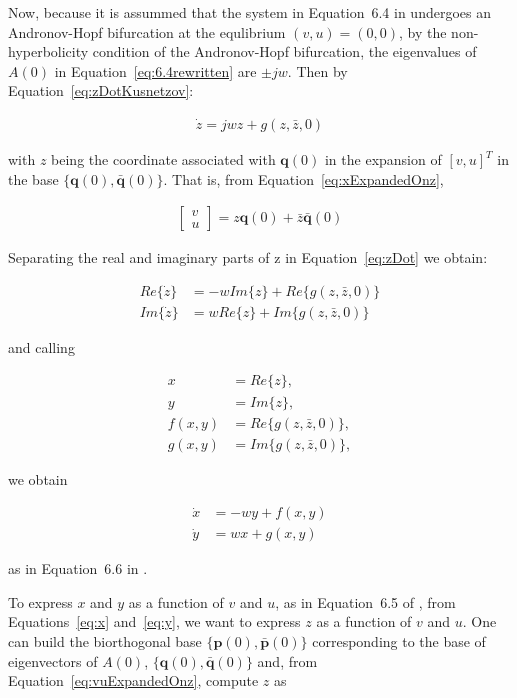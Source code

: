 \documentclass{article}
\theoremstyle{lemma}
\begin{document}
Now, because it is assummed that the system in Equation~6.4 in
\citet{izhikevich07} undergoes an Andronov-Hopf bifurcation at the equlibrium
$(v,u)=(0,0)$, by the non-hyperbolicity condition of the Andronov-Hopf
bifurcation, the eigenvalues of $A(0)$
in Equation~\ref{eq:6.4rewritten} are $\pm jw$. Then by
Equation~\ref{eq:zDotKusnetzov}:

\begin{align}
    \dot{z}=jwz+g(z,\bar{z},0)
    \label{eq:zDot}
\end{align}

\noindent with 
$z$ being
the coordinate associated with $\mathbf{q}(0)$ in the expansion of
$[v,u]^T$ in the base $\{\mathbf{q}(0),\mathbf{\bar{q}}(0)\}$.
That is, from Equation~\ref{eq:xExpandedOnz},

\begin{align}
\left[\begin{array}{c}
        v\\
        u
       \end{array}\right]=z\mathbf{q}(0)+\bar{z}\mathbf{\bar{q}}(0)
\label{eq:vuExpandedOnz}
\end{align}

Separating the real and imaginary parts of z in Equation~\ref{eq:zDot} we
obtain:

\begin{align}
    Re\{\dot{z}\}&=-wIm\{z\}+Re\{g(z,\bar{z},0)\}\nonumber\\
    Im\{\dot{z}\}&=wRe\{z\}+Im\{g(z,\bar{z},0)\}\nonumber
\end{align}

\noindent and calling 

\begin{align}
x&=Re\{z\},\label{eq:x}\\
y&=Im\{z\},\label{eq:y}\\
f(x,y)&=Re\{g(z,\bar{z},0)\},\label{eq:f}\\
g(x,y)&=Im\{g(z,\bar{z},0)\}\label{eq:g},
\end{align}

\noindent we obtain

\begin{align}
    \dot{x}&=-wy+f(x,y)\nonumber\\
    \dot{y}&=wx+g(x,y\nonumber)
\end{align}

\noindent as in Equation~6.6 in \citet{izhikevich07}.

To express $x$ and $y$ as a function of $v$ and $u$, as in Equation~6.5 of
\citet{izhikevich07}, from Equations~\ref{eq:x} and~\ref{eq:y}, we want to
express $z$ as a function of $v$ and $u$. One can build the
biorthogonal base $\{\mathbf{p}(0),\mathbf{\bar{p}}(0)\}$ corresponding to the
base of eigenvectors of $A(0)$,
$\{\mathbf{q}(0),\mathbf{\bar{q}}(0)\}$ and, from
Equation~\ref{eq:vuExpandedOnz}, compute $z$ as
\end{document}
